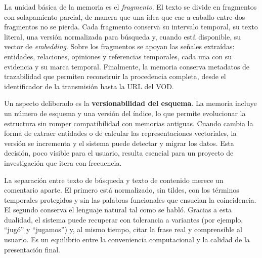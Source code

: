\documentclass[12pt,a4paper]{article}
\begin{document}
La unidad básica de la memoria es el \emph{fragmento}. El texto se divide en fragmentos con solapamiento parcial, de manera que una idea que cae a caballo entre dos fragmentos no se pierda. Cada fragmento conserva su intervalo temporal, su texto literal, una versión normalizada para búsqueda y, cuando está disponible, su vector de \emph{embedding}. Sobre los fragmentos se apoyan las señales extraídas: entidades, relaciones, opiniones y referencias temporales, cada una con su evidencia y su marca temporal. Finalmente, la memoria conserva metadatos de trazabilidad que permiten reconstruir la procedencia completa, desde el identificador de la transmisión hasta la URL del VOD.

Un aspecto deliberado es la \textbf{versionabilidad del esquema}. La memoria incluye un número de esquema y una versión del índice, lo que permite evolucionar la estructura sin romper compatibilidad con memorias antiguas. Cuando cambia la forma de extraer entidades o de calcular las representaciones vectoriales, la versión se incrementa y el sistema puede detectar y migrar los datos. Esta decisión, poco visible para el usuario, resulta esencial para un proyecto de investigación que itera con frecuencia.

La separación entre texto de búsqueda y texto de contenido merece un comentario aparte. El primero está normalizado, sin tildes, con los términos temporales protegidos y sin las palabras funcionales que ensucian la coincidencia. El segundo conserva el lenguaje natural tal como se habló. Gracias a esta dualidad, el sistema puede recuperar con tolerancia a variantes (por ejemplo, ``jugó'' y ``jugamos'') y, al mismo tiempo, citar la frase real y comprensible al usuario. Es un equilibrio entre la conveniencia computacional y la calidad de la presentación final.
\end{document}
